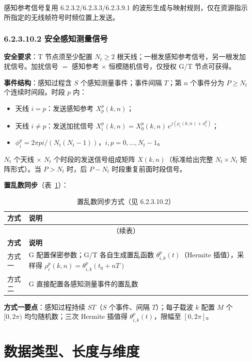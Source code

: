 \documentclass[11pt,a4paper]{ctexart}
\begin{document}
感知参考信号复用 6.2.3.2/6.2.3.3/6.2.3.9.1 的波形生成与映射规则，仅在资源指示所指定的无线帧符号时频位置上发送。

\subsubsection{6.2.3.10.2 安全感知测量信号}

\textbf{安全要求}：T 节点须至少配置 $N_t\geq 2$ 根天线；一根发感知参考信号，另一根发加扰信号。加扰信号 $=$ 感知参考 $\times$ 恒模随机信号，仅授权 G/T 节点可获得。

\textbf{事件结构}：感知过程含 $S$ 个感知测量事件；事件间隔 $T$；第 $n$ 个事件分为 $P\geq N_t$ 个连续时间段。时段 $p$ 内：
\begin{itemize}[nosep]
  \item 天线 $i{=}p$：发送感知参考 $X_p^p(k,n)$；
  \item 天线 $i{\neq}p$：发送加扰信号 $X_i^p(k,n)=X_0^p(k,n)\,e^{j(\rho_i(k,n)+\phi_i^p)}$；
  \item $\phi_i^p = 2\pi p i / (N_t(N_t{-}1))$，$i,p=0,\ldots,N_t{-}1$。
\end{itemize}

$N_t$ 个天线 $\times$ $N_t$ 个时段的发送信号组成矩阵 $X(k,n)$（标准给出完整 $N_t\times N_t$ 矩阵形式）。当 $P>N_t$ 时，后 $P{-}N_t$ 时段重复前面时段信号。

\textbf{置乱数同步}（表~\ref{tab:623-scramble-sync}）：
\begin{longtable}{ll}
\caption{置乱数同步方式（见 6.2.3.10.2）\label{tab:623-scramble-sync}} \\
\toprule
\textbf{方式} & \textbf{说明} \\
\midrule
\endfirsthead
\multicolumn{2}{c}{\small（续表）} \\
\toprule
\textbf{方式} & \textbf{说明} \\
\midrule
\endhead
\bottomrule
\endfoot
方式一 & G 配置保密参数；G/T 各自生成置乱函数 $\theta_{i,k}^p(t)$（Hermite 插值），采样得 $\rho_i^p(k,n)=\theta_{i,k}^p(t_0+nT)$ \\
方式二 & G 直接配置各感知测量事件的置乱数 \\
\end{longtable}

\textbf{方式一要点}：感知过程持续 $ST$（$S$ 个事件、间隔 $T$）；每子载波 $k$ 配置 $M$ 个 $[0,2\pi)$ 均匀随机数；三次 Hermite 插值得 $\theta_{i,k}^p(t)$，限幅至 $[0,2\pi]$。

\section{数据类型、长度与维度}
\end{document}
